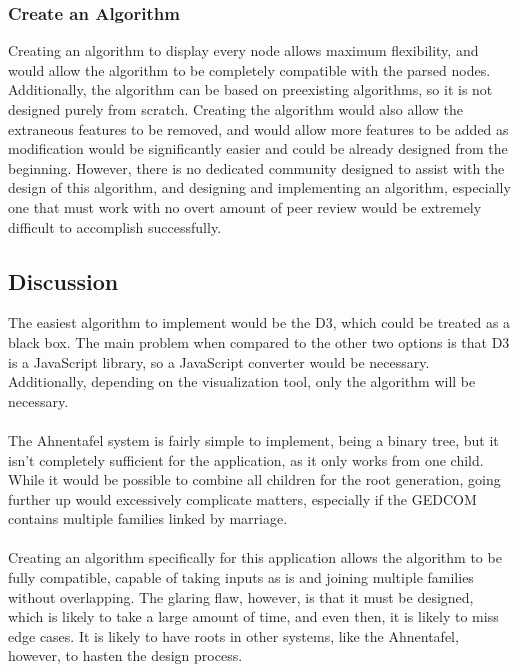 \documentclass[onecolumn, draftclsnofoot,10pt, compsoc]{IEEEtran}
\begin{document}
\subsubsection{Create an Algorithm}
Creating an algorithm to display every node allows maximum flexibility, and would allow the algorithm to be completely compatible with the parsed nodes. Additionally, the algorithm can be based on preexisting algorithms, so it is not designed purely from scratch. Creating the algorithm would also allow the extraneous features to be removed, and would allow more features to be added as modification would be significantly easier and could be already designed from the beginning. However, there is no dedicated community designed to assist with the design of this algorithm, and designing and implementing an algorithm, especially one that must work with no overt amount of peer review would be extremely difficult to accomplish successfully.

\subsection{Discussion}
The easiest algorithm to implement would be the D3, which could be treated as a black box. The main problem when compared to the other two options is that D3 is a JavaScript library, so a JavaScript converter would be necessary. Additionally, depending on the visualization tool, only the algorithm will be necessary.
\\
\\
The Ahnentafel system is fairly simple to implement, being a binary tree, but it isn't completely sufficient for the application, as it only works from one child. While it would be possible to combine all children for the root generation, going further up would excessively complicate matters, especially if the GEDCOM contains multiple families linked by marriage.
\\
\\
Creating an algorithm specifically for this application allows the algorithm to be fully compatible, capable of taking inputs as is and joining multiple families without overlapping. The glaring flaw, however, is that it must be designed, which is likely to take a large amount of time, and even then, it is likely to miss edge cases. It is likely to have roots in other systems, like the Ahnentafel, however, to hasten the design process.
\end{document}
